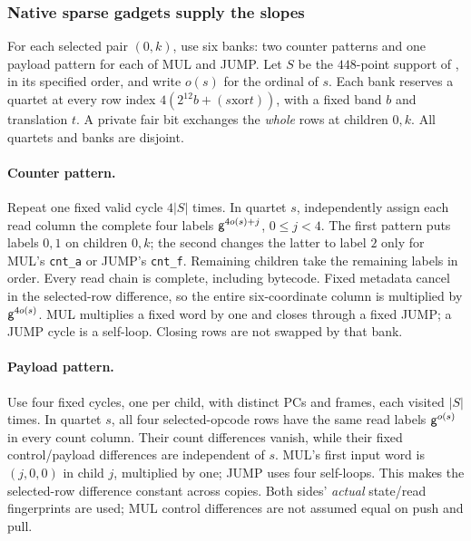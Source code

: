\subsubsection{Native sparse gadgets supply the slopes}

For each selected pair $(0,k)$, use six banks: two counter patterns and one payload pattern for each of MUL and JUMP. Let $S$ be the $448$-point support of , in its specified order, and write $o(s)$ for the ordinal of $s$. Each bank reserves a quartet at every row index $4(2^{12}b+(s\mathbin{\mathrm{xor}}t))$, with a fixed band $b$ and translation $t$. A private fair bit exchanges the \emph{whole} rows at children $0,k$. All quartets and banks are disjoint.

\paragraph{Counter pattern.} Repeat one fixed valid cycle $4|S|$ times. In quartet $s$, independently assign each read column the complete four labels $\mathsf{g}^{4o(s)+j}$, $0\le j<4$. The first pattern puts labels $0,1$ on children $0,k$; the second changes the latter to label $2$ only for MUL's \texttt{cnt\_a} or JUMP's \texttt{cnt\_f}. Remaining children take the remaining labels in order. Every read chain is complete, including bytecode. Fixed metadata cancel in the selected-row difference, so the entire six-coordinate column is multiplied by $\mathsf{g}^{4o(s)}$. MUL multiplies a fixed word by one and closes through a fixed JUMP; a JUMP cycle is a self-loop. Closing rows are not swapped by that bank.

\paragraph{Payload pattern.} Use four fixed cycles, one per child, with distinct PCs and frames, each visited $|S|$ times. In quartet $s$, all four selected-opcode rows have the same read labels $\mathsf{g}^{o(s)}$ in every count column. Their count differences vanish, while their fixed control/payload differences are independent of $s$. MUL's first input word is $(j,0,0)$ in child $j$, multiplied by one; JUMP uses four self-loops. This makes the selected-row difference constant across copies. Both sides' \emph{actual} state/read fingerprints are used; MUL control differences are not assumed equal on push and pull.

